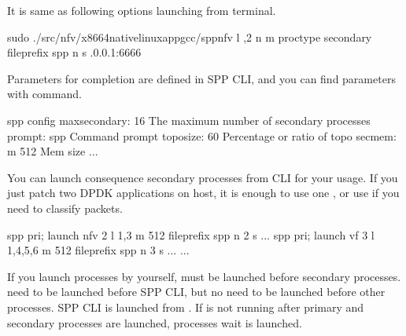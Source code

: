 \documentclass[a4paper,11pt,openany,oneside,english]{sphinxmanual}
\begin{document}
It is same as following options launching from terminal.

\begin{sphinxVerbatim}[commandchars=\\\{\},formatcom=\footnotesize]
 sudo ./src/nfv/x86\PYGZus{}64\PYGZhy{}native\PYGZhy{}linuxapp\PYGZhy{}gcc/spp\PYGZus{}nfv 
    \PYGZhy{}l ,2 \PYGZhy{}n  \PYGZhy{}m  
    \PYGZhy{}\PYGZhy{}proc\PYGZhy{}type secondary 
    \PYGZhy{}\PYGZhy{}file\PYGZhy{}prefix spp 
    \PYGZhy{}\PYGZhy{} 
    \PYGZhy{}n  
    \PYGZhy{}s .0.0.1:6666
\end{sphinxVerbatim}

Parameters for completion are defined in SPP CLI, and you can find
parameters with  command.

\begin{sphinxVerbatim}[commandchars=\\\{\},formatcom=\footnotesize]
spp \PYGZgt{} config
\PYGZhy{} max\PYGZus{}secondary: \PYGZdq{}16\PYGZdq{}   \PYGZsh{} The maximum number of secondary processes
\PYGZhy{} prompt: \PYGZdq{}spp \PYGZgt{} \PYGZdq{}  \PYGZsh{} Command prompt
\PYGZhy{} topo\PYGZus{}size: \PYGZdq{}60\PYGZpc{}\PYGZdq{}  \PYGZsh{} Percentage or ratio of topo
\PYGZhy{} sec\PYGZus{}mem: \PYGZdq{}\PYGZhy{}m 512\PYGZdq{} \PYGZsh{} Mem size
...
\end{sphinxVerbatim}

You can launch consequence secondary processes from CLI for your usage.
If you just patch two DPDK applications on host, it is enough to use one
, or use  if you need to classify packets.

\begin{sphinxVerbatim}[commandchars=\\\{\},formatcom=\footnotesize]
spp \PYGZgt{} pri; launch nfv 2 \PYGZhy{}l 1,3 \PYGZhy{}m 512 \PYGZhy{}\PYGZhy{}file\PYGZhy{}prefix spp \PYGZhy{}\PYGZhy{} \PYGZhy{}n 2 \PYGZhy{}s ...
spp \PYGZgt{} pri; launch vf 3 \PYGZhy{}l 1,4,5,6 \PYGZhy{}m 512 \PYGZhy{}\PYGZhy{}file\PYGZhy{}prefix spp \PYGZhy{}\PYGZhy{} \PYGZhy{}n 3 \PYGZhy{}s ...
...
\end{sphinxVerbatim}

If you launch processes by yourself,  must be launched
before secondary processes.
 need to be launched before SPP CLI, but no need to be launched
before other processes. SPP CLI is launched from .
If  is not running after primary and
secondary processes are launched, processes wait  is launched.
\end{document}
